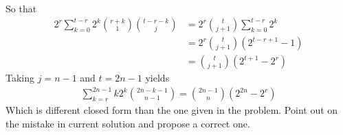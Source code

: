 So that
\begin{align*}
    2^r \sum_{k=0}^{t-r} 2^{k} \binom{r+k}{1} \binom{t-r-k}{j} &= 2^r \binom{t}{j+1} \sum_{k=0}^{t-r} 2^{k} \\
    &= 2^r \binom{t}{j+1} (2^{t-r+1} - 1) \\
    &= \binom{t}{j+1} (2^{t+1} - 2^r)
\end{align*}
Taking $j=n-1$ and $t=2n-1$ yields
\begin{align*}
    \sum_{k=r}^{2n-1} k2^k \binom{2n-k-1}{n-1} = \binom{2n-1}{n} (2^{2n} - 2^{r})
\end{align*}
Which is different closed form than the one given in the problem.
Point out on the mistake in current solution and propose a correct one.


\clearpage

